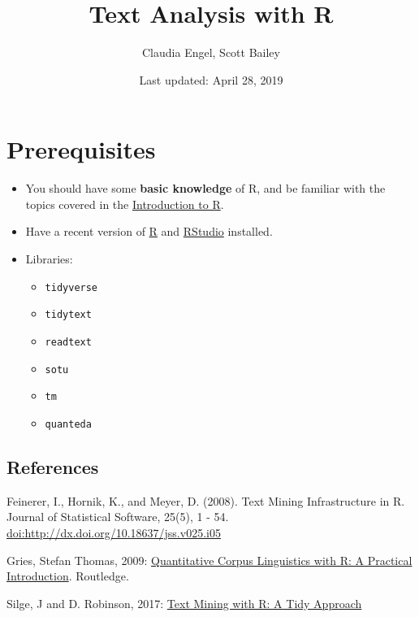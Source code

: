 \documentclass[]{book}
\title{Text Analysis with R}
\author{Claudia Engel, Scott Bailey}
\date{Last updated: April 28, 2019}
\providecommand{\tightlist}{%
  \setlength{\itemsep}{0pt}\setlength{\parskip}{0pt}}
\begin{document}
\maketitle

{
\setcounter{tocdepth}{1}
\tableofcontents
}
\hypertarget{prerequisites}{%
\chapter*{Prerequisites}\label{prerequisites}}

\begin{itemize}
\item
  You should have some \textbf{basic knowledge} of R, and be familiar with the topics covered in the \href{https://cengel.github.io/R-intro/}{Introduction to R}.
\item
  Have a recent version of \href{https://cran.r-project.org/}{R} and \href{https://www.rstudio.com/}{RStudio} installed.
\item
  Libraries:

  \begin{itemize}
  \tightlist
  \item
    \texttt{tidyverse}
  \item
    \texttt{tidytext}
  \item
    \texttt{readtext}
  \item
    \texttt{sotu}
  \item
    \texttt{tm}
  \item
    \texttt{quanteda}
  \end{itemize}
\end{itemize}

\hypertarget{references}{%
\section*{References}\label{references}}

Feinerer, I., Hornik, K., and Meyer, D. (2008). Text Mining Infrastructure in R. Journal of Statistical Software, 25(5), 1 - 54. \url{doi:http://dx.doi.org/10.18637/jss.v025.i05}

Gries, Stefan Thomas, 2009: \href{http://www.stgries.info/research/qclwr/qclwr.html}{Quantitative Corpus Linguistics with R: A Practical Introduction}. Routledge.

Silge, J and D. Robinson, 2017: \href{http://tidytextmining.com/}{Text Mining with R: A Tidy Approach}
\end{document}
